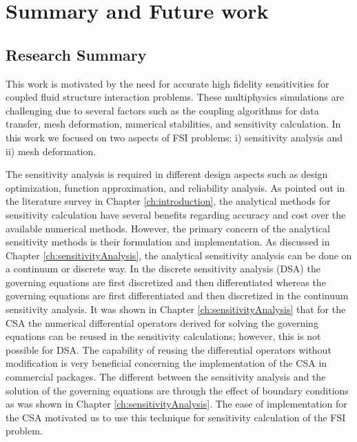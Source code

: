 \chapter{Summary and Future work}
\section{Research Summary}
This work is motivated by the need for accurate high fidelity sensitivities for coupled fluid structure interaction problems. These multiphysics simulations are challenging due to several factors such as the coupling algorithms for data transfer, mesh deformation, numerical stabilities, and sensitivity calculation. In this work we focused on two aspects of FSI problems: i) sensitivity analysis and ii) mesh deformation.

The sensitivity analysis is required in different design aspects such as design optimization, function approximation, and reliability analysis. As pointed out in the literature survey in Chapter \ref{ch:introduction}, the analytical methods for sensitivity calculation have several benefits regarding accuracy and cost over the available numerical methods. However, the primary concern of the analytical sensitivity methods is their formulation and implementation. As discussed in Chapter \ref{ch:sensitivityAnalysis}, the analytical sensitivity analysis can be done on a continuum or discrete way. In the discrete sensitivity analysis (DSA) the governing equations are first discretized and then differentiated whereas the governing equations are first differentiated and then discretized in the continuum sensitivity analysis. It was shown in Chapter \ref{ch:sensitivityAnalysis} that for the CSA the numerical differential operators derived for solving the governing equations can be reused in the sensitivity calculations; however, this is not possible for DSA. The capability of reusing the differential operators without modification is very beneficial concerning the implementation of the CSA in commercial packages. The different between the sensitivity analysis and the solution of the governing equations are through the effect of boundary conditions as was shown in Chapter \ref{ch:sensitivityAnalysis}. The ease of implementation for the CSA motivated us to use this technique for sensitivity calculation of the FSI problem.

